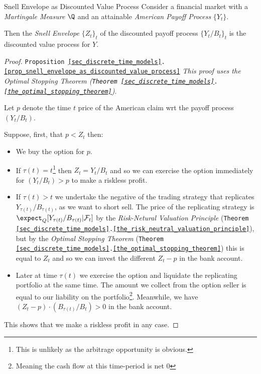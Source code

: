 \documentclass[11pt,a4paper]{article}
\begin{document}
  \begin{proposition}{Snell Envelope as Discounted Value Process}\label{prop_snell_envelope_as_discounted_value_process}
    Consider a financial market with a \textit{Martingale Measure} $\Q$ and an attainable \textit{American Payoff Process} $\{Y_t\}$.
    \par Then the \textit{Snell Envelope} $\{Z_t\}_t$ of the discounted payoff process $\{Y_t/B_t\}_t$ is the discounted value process for $Y$.
  \end{proposition}

  \begin{proof}{\texttt{Proposition \ref{sec_discrete_time_models}.\ref{prop_snell_envelope_as_discounted_value_process}}}
    \textit{This proof uses the Optimal Stopping Theorem (\texttt{Theorem \ref{sec_discrete_time_models}.\ref{the_optimal_stopping_theorem}})}.
    \par Let $p$ denote the time $t$ price of the American claim wrt the payoff process $(Y_t/B_t)$.
    \par Suppose, first, that $p<Z_t$ then:
    \begin{itemize}
      \item We buy the option for $p$.
      \item If $\tau(t)=t$\footnote{This is unlikely as the arbitrage opportunity is obvious.} then $Z_t=Y_t/B_t$ and so we can exercise the option immediately for $(Y_t/B_t)>p$ to make a riskless profit.
      \item If $\tau(t)>t$ we undertake the negative of the trading strategy that replicates $Y_{\tau(t)}/B_{\tau(t)}$, as we want to short sell. The price of the replicating strategy is $\expect_Q[Y_{\tau(t)}/B_{\tau(t)}|\mathcal{F}_t]$ by the \textit{Risk-Netural Valuation Principle} (\texttt{Theorem \ref{sec_discrete_time_models}.\ref{the_risk_neutral_valuation_principle}}), but by the \textit{Optimal Stopping Theorem} (\texttt{Theorem \ref{sec_discrete_time_models}.\ref{the_optimal_stopping_theorem}}) this is equal to $Z_t$ and so we can invest the different $Z_t-p$ in the bank account.
      \item Later at time $\tau(t)$ we exercise the option and liquidate the replicating portfolio at the same time. The amount we collect from the option seller is equal to our liability on the portfolio\footnote{Meaning the cash flow at this time-period is net 0}. Meanwhile, we have $(Z_t-p)\cdot(B_{\tau(t)}/B_t)>0$ in the bank account.
    \end{itemize}
    This shows that we make a riskless profit in any case.


\end{proof}
\end{document}
